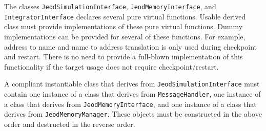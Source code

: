 The classes \verb|JeodSimulationInterface|,
\verb|JeodMemoryInterface|, and \verb|IntegratorInterface|
declares several pure virtual functions.
Usable derived class must provide implementations
of these pure virtual functions.
Dummy implementations can be provided for several of
these functions. For example, address to name and name to address
translation is only used during checkpoint and restart. There is no
need to provide a full-blown implementation of this functionality
if the target usage does not require checkpoint/restart.

A compliant instantiable class that derives from
\verb|JeodSimulationInterface| must contain
one instance of a class that derives from \verb|MessageHandler|,
one instance of a class that derives from \verb|JeodMemoryInterface|, and
one instance of a class that derives from \verb|JeodMemoryManager|.
These objects must be constructed in the above order
and destructed in the reverse order.
